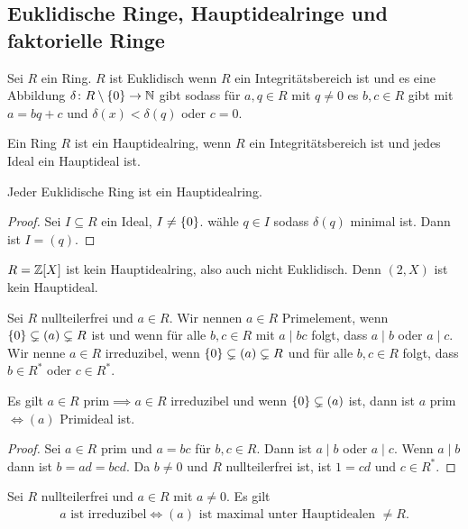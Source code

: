 \subsection{Euklidische Ringe, Hauptidealringe und faktorielle Ringe}
\begin{Def}
    Sei $R$ ein Ring. $R$ ist Euklidisch wenn $R$ ein Integritätsbereich ist und es eine Abbildung $\delta\colon R\setminus\{0\}\to\mathbb{N}$ gibt sodass für $a,q\in R$ mit $q\neq 0$ es $b,c\in R$ gibt mit $a=bq+c$ und $\delta(x)<\delta(q)$ oder $c=0$.
\end{Def}
\begin{Def}
    Ein Ring $R$ ist ein Hauptidealring, wenn $R$ ein Integritätsbereich ist und jedes Ideal ein Hauptideal ist.
\end{Def}
\begin{Satz}
    Jeder Euklidische Ring ist ein Hauptidealring.
\end{Satz}
\begin{proof}
    Sei $I\subseteq R$ ein Ideal, $I\neq \{0\}$. wähle $q\in I$ sodass $\delta(q)$ minimal ist. Dann ist $I=(q)$.
\end{proof}
\begin{Bsp}
    $R=\mathbb{Z}[X]$ ist kein Hauptidealring, also auch nicht Euklidisch. Denn $(2,X)$ ist kein Hauptideal.
\end{Bsp}
\begin{Def}
    Sei $R$ nullteilerfrei und $a\in R$. Wir nennen $a\in R$ Primelement, wenn $\{0\}\subsetneq (a)\subsetneq R$ ist und wenn für alle $b,c\in R$ mit $a\mid bc$ folgt, dass $a\mid b$ oder $a\mid c$.\\
    Wir nenne $a\in R$ irreduzibel, wenn $\{0\}\subsetneq (a)\subsetneq R$ und für alle $b,c\in R$ folgt, dass $b\in R^*$ oder $c\in R^*$.
\end{Def}
\begin{Bem}
    Es gilt $a\in R\text{ prim}\implies a\in R\text{ irreduzibel}$ und wenn $\{0\}\subsetneq (a)$ ist, dann ist $a$ prim $\iff (a)$ Primideal ist.
\end{Bem}
\begin{proof}
    Sei $a\in R$ prim und $a=bc$ für $b,c\in R$. Dann ist $a\mid b$ oder $a\mid c$. Wenn $a\mid b$ dann ist $b=ad=bcd$. Da $b\neq 0$ und $R$ nullteilerfrei ist, ist $1=cd$ und $c\in R^*$.
\end{proof}
\begin{Lemma}
    Sei $R$ nullteilerfrei und $a\in R$ mit $a\neq 0$. Es gilt 
    \begin{align*}
        a \text{ ist irreduzibel} \iff (a) \text{ ist maximal unter Hauptidealen $\neq R$.}
    \end{align*}
\end{Lemma}
